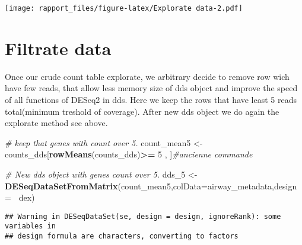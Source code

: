 \documentclass[]{article}
\newenvironment{Shaded}{\begin{snugshade}}{\end{snugshade}}
\newcommand{\KeywordTok}[1]{\textcolor[rgb]{0.13,0.29,0.53}{\textbf{#1}}}
\newcommand{\DataTypeTok}[1]{\textcolor[rgb]{0.13,0.29,0.53}{#1}}
\newcommand{\DecValTok}[1]{\textcolor[rgb]{0.00,0.00,0.81}{#1}}
\newcommand{\StringTok}[1]{\textcolor[rgb]{0.31,0.60,0.02}{#1}}
\newcommand{\CommentTok}[1]{\textcolor[rgb]{0.56,0.35,0.01}{\textit{#1}}}
\newcommand{\OperatorTok}[1]{\textcolor[rgb]{0.81,0.36,0.00}{\textbf{#1}}}
\newcommand{\NormalTok}[1]{#1}
\begin{document}
\texttt{[image: rapport\_files/figure-latex/Explorate data-2.pdf]}

\section{Filtrate data}\label{filtrate-data}

Once our crude count table explorate, we arbitrary decide to remove row
wich have few reads, that allow less memory size of dds object and
improve the speed of all functions of DESeq2 in dds. Here we keep the
rows that have least 5 reads total(minimum treshold of coverage). After
new dds object we do again the explorate method see above.

\begin{Shaded}
\begin{Highlighting}[]
\CommentTok{# keep that genes with count over 5.}
\NormalTok{count_mean5 <-}\StringTok{ }\NormalTok{counts_dds[}\KeywordTok{rowMeans}\NormalTok{(counts_dds)}\OperatorTok{>=}\StringTok{ }\DecValTok{5}\NormalTok{ , ]}\CommentTok{#ancienne commande }

\CommentTok{# New dds object with genes count over 5.}
\NormalTok{dds_}\DecValTok{5}\NormalTok{ <-}\StringTok{ }\KeywordTok{DESeqDataSetFromMatrix}\NormalTok{(count_mean5,}\DataTypeTok{colData=}\NormalTok{airway_metadata,}\DataTypeTok{design =} \OperatorTok{~}\NormalTok{dex)}
\end{Highlighting}
\end{Shaded}

\begin{verbatim}
## Warning in DESeqDataSet(se, design = design, ignoreRank): some variables in
## design formula are characters, converting to factors
\end{verbatim}
\end{document}
